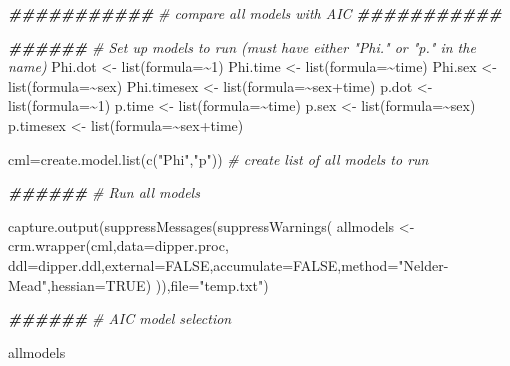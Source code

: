 \documentclass[
]{article}
\newenvironment{Shaded}{\begin{snugshade}}{\end{snugshade}}
\newcommand{\AttributeTok}[1]{\textcolor[rgb]{0.77,0.63,0.00}{#1}}
\newcommand{\CommentTok}[1]{\textcolor[rgb]{0.56,0.35,0.01}{\textit{#1}}}
\newcommand{\ConstantTok}[1]{\textcolor[rgb]{0.00,0.00,0.00}{#1}}
\newcommand{\DecValTok}[1]{\textcolor[rgb]{0.00,0.00,0.81}{#1}}
\newcommand{\DocumentationTok}[1]{\textcolor[rgb]{0.56,0.35,0.01}{\textbf{\textit{#1}}}}
\newcommand{\FunctionTok}[1]{\textcolor[rgb]{0.00,0.00,0.00}{#1}}
\newcommand{\NormalTok}[1]{#1}
\newcommand{\OtherTok}[1]{\textcolor[rgb]{0.56,0.35,0.01}{#1}}
\newcommand{\SpecialCharTok}[1]{\textcolor[rgb]{0.00,0.00,0.00}{#1}}
\newcommand{\StringTok}[1]{\textcolor[rgb]{0.31,0.60,0.02}{#1}}
\begin{document}
\begin{Shaded}
\begin{Highlighting}[]
\DocumentationTok{\#\#\#\#\#\#\#\#\#\#\#}
\CommentTok{\# compare all models with AIC}
\DocumentationTok{\#\#\#\#\#\#\#\#\#\#\#}

\DocumentationTok{\#\#\#\#\#\#}
\CommentTok{\# Set up models to run (must have either "Phi." or "p." in the name)}
\NormalTok{Phi.dot }\OtherTok{\textless{}{-}} \FunctionTok{list}\NormalTok{(}\AttributeTok{formula=}\SpecialCharTok{\textasciitilde{}}\DecValTok{1}\NormalTok{)       }
\NormalTok{Phi.time }\OtherTok{\textless{}{-}} \FunctionTok{list}\NormalTok{(}\AttributeTok{formula=}\SpecialCharTok{\textasciitilde{}}\NormalTok{time)}
\NormalTok{Phi.sex }\OtherTok{\textless{}{-}} \FunctionTok{list}\NormalTok{(}\AttributeTok{formula=}\SpecialCharTok{\textasciitilde{}}\NormalTok{sex)}
\NormalTok{Phi.timesex }\OtherTok{\textless{}{-}} \FunctionTok{list}\NormalTok{(}\AttributeTok{formula=}\SpecialCharTok{\textasciitilde{}}\NormalTok{sex}\SpecialCharTok{+}\NormalTok{time)}
\NormalTok{p.dot }\OtherTok{\textless{}{-}} \FunctionTok{list}\NormalTok{(}\AttributeTok{formula=}\SpecialCharTok{\textasciitilde{}}\DecValTok{1}\NormalTok{)}
\NormalTok{p.time }\OtherTok{\textless{}{-}} \FunctionTok{list}\NormalTok{(}\AttributeTok{formula=}\SpecialCharTok{\textasciitilde{}}\NormalTok{time)}
\NormalTok{p.sex }\OtherTok{\textless{}{-}} \FunctionTok{list}\NormalTok{(}\AttributeTok{formula=}\SpecialCharTok{\textasciitilde{}}\NormalTok{sex)}
\NormalTok{p.timesex }\OtherTok{\textless{}{-}} \FunctionTok{list}\NormalTok{(}\AttributeTok{formula=}\SpecialCharTok{\textasciitilde{}}\NormalTok{sex}\SpecialCharTok{+}\NormalTok{time)}

\NormalTok{cml}\OtherTok{=}\FunctionTok{create.model.list}\NormalTok{(}\FunctionTok{c}\NormalTok{(}\StringTok{"Phi"}\NormalTok{,}\StringTok{"p"}\NormalTok{))    }\CommentTok{\# create list of all models to run}

\DocumentationTok{\#\#\#\#\#\#}
\CommentTok{\# Run all models}

\FunctionTok{capture.output}\NormalTok{(}\FunctionTok{suppressMessages}\NormalTok{(}\FunctionTok{suppressWarnings}\NormalTok{(}
\NormalTok{  allmodels }\OtherTok{\textless{}{-}} \FunctionTok{crm.wrapper}\NormalTok{(cml,}\AttributeTok{data=}\NormalTok{dipper.proc, }\AttributeTok{ddl=}\NormalTok{dipper.ddl,}\AttributeTok{external=}\ConstantTok{FALSE}\NormalTok{,}\AttributeTok{accumulate=}\ConstantTok{FALSE}\NormalTok{,}\AttributeTok{method=}\StringTok{"Nelder{-}Mead"}\NormalTok{,}\AttributeTok{hessian=}\ConstantTok{TRUE}\NormalTok{)}
\NormalTok{)),}\AttributeTok{file=}\StringTok{"temp.txt"}\NormalTok{)}

\DocumentationTok{\#\#\#\#\#\#}
\CommentTok{\# AIC model selection}

\NormalTok{allmodels}
\end{Highlighting}
\end{Shaded}
\end{document}
